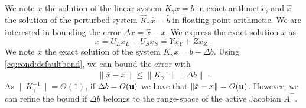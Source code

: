 We note $x$ the solution of the linear system $K_\gamma x = b$
in exact arithmetic, and $\widehat{x}$ the solution of
the perturbed system $\widehat{K}_\gamma \widehat{x} = \widehat{b}$
in floating point arithmetic. We are interested in bounding
the error $\Delta x = \widehat{x} - x$. We express the exact solution $x$ as
\begin{equation}
  x = U_L x_L + U_S x_S = Y x_Y + Z x_Z \; .
\end{equation}
We note $\bar{x}$ the exact solution of the system
$K_\gamma \bar{x} = b + \Delta b$. Using \eqref{eq:cond:defaultbond},
we can bound the error with
\begin{equation}
  \| \bar{x} - x\| \leq \| K_\gamma^{-1} \| \|\Delta b \| \; .
\end{equation}
As $\| K_\gamma^{-1}\| = \Theta(1)$, if $\Delta b = O(\mathbf{u})$ we have that
$\| \bar{x} - x \| = O(\mathbf{u})$. However, we can
refine the bound if $\Delta b$ belongs to the range-space
of the active Jacobian $A^\top$.

